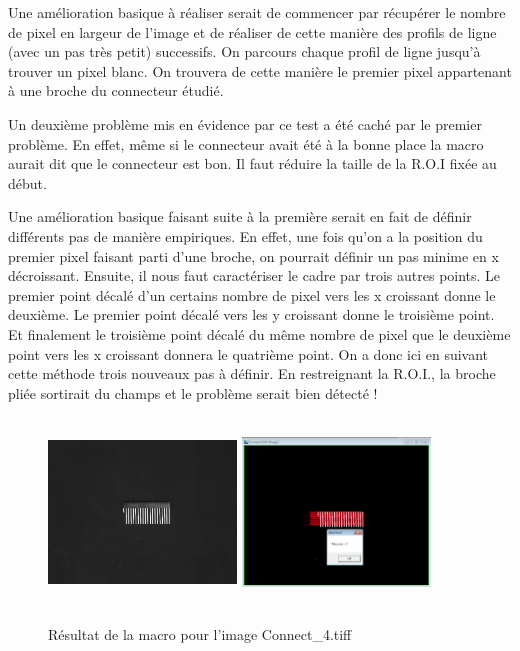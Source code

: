 \documentclass{scrreprt}
\begin{document}
Une amélioration basique à réaliser serait de commencer par récupérer le nombre de pixel en largeur de l'image et de réaliser de cette
manière des profils de ligne (avec un pas très petit) successifs. On parcours chaque profil de ligne jusqu'à trouver un pixel blanc. 
On trouvera de cette manière le premier pixel appartenant à une broche du connecteur étudié. 

Un deuxième problème mis en évidence par ce test a été caché par le premier problème. En effet, même si le connecteur avait été à la bonne place
la macro aurait dit que le connecteur est bon. Il faut réduire la taille de la R.O.I fixée au début.

Une amélioration basique faisant suite à la première serait en fait de définir différents pas de manière empiriques. En effet, une fois qu'on a la 
position du premier pixel faisant parti d'une broche, on pourrait définir un pas minime en x décroissant. Ensuite, il nous faut caractériser le cadre
par trois autres points. Le premier point décalé d'un certains nombre de pixel vers les x croissant donne le deuxième. Le premier point décalé vers 
les y croissant donne le troisième point. Et finalement le troisième point décalé du même nombre de pixel que le deuxième point vers les x croissant donnera
le quatrième point. On a donc ici en suivant cette méthode trois nouveaux pas à définir. En restreignant la R.O.I., la broche pliée sortirait du champs et
le problème serait bien détecté !

\begin{figure}[!h]
\centering
\includegraphics[width=5cm, height=5cm]{images/Connect4o.png}\hfill
\includegraphics[width=5cm, height=5cm]{images/connecteur4.png}
\caption{Résultat de la macro pour l'image Connect_4.tiff}
\end{figure} 
\end{document}
